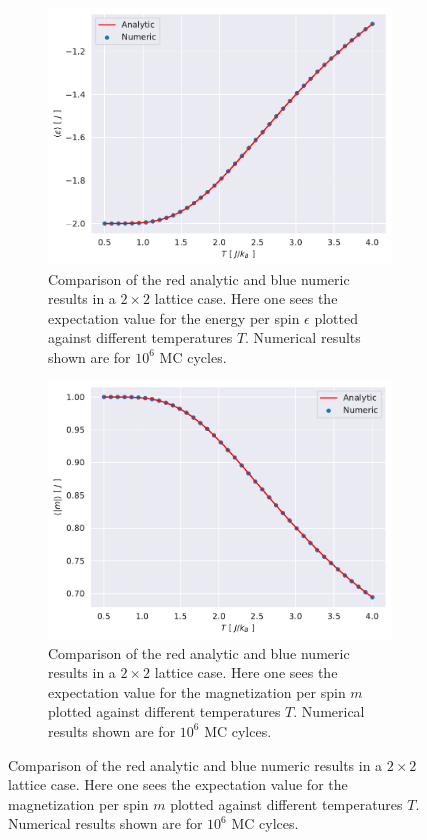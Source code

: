 \documentclass[english,notitlepage,reprint,nofootinbib]{revtex4-1}  %
\begin{document}
\begin{figure}[H]
    \begin{subfigure}{.5\textwidth}
        \centering
        \includegraphics[width=1\textwidth]{../figures/numeric_analytic_e_T.pdf}
        \caption{Comparison of the red analytic and blue numeric results in a $2\times2$ lattice case. Here one sees the expectation value for the energy per spin $\epsilon$ plotted against different temperatures $T$. Numerical results shown are for $10^6$ MC cycles.}
        \label{fig:numeric_analytic_e_T}
    \end{subfigure}

    \begin{subfigure}{.5\textwidth}
        \centering
        \includegraphics[width=1\textwidth]{../figures/numeric_analytic_m_T.pdf}
        \caption{Comparison of the red analytic and blue numeric results in a $2\times2$ lattice case. Here one sees the expectation value for the magnetization per spin $m$ plotted against different temperatures $T$. Numerical results shown are for $10^6$ MC cylces.}
        \label{fig:numeric_analytic_m_T}
    \end{subfigure}


\end{figure}
\end{document}
